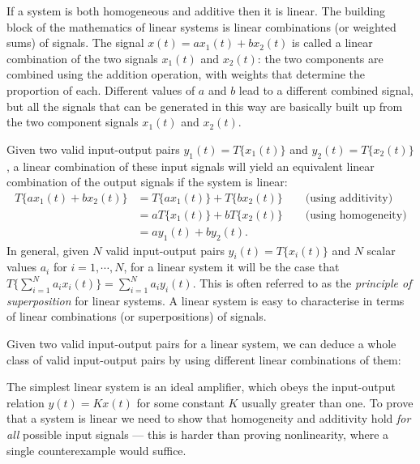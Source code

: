 \documentclass[10pt]{beamer}
\begin{document}
If a system is both homogeneous and additive then it is linear.  The building block of the mathematics of linear systems is linear combinations (or weighted sums) of signals.  The signal $x(t) = a x_1(t) + b x_2(t)$ is called a linear combination of the two signals $x_1(t)$ and $x_2(t)$:  the two components are combined using the addition operation, with weights that determine the proportion of each.  Different values of $a$ and $b$ lead to a different combined signal, but all the signals that can be generated in this way are basically built up from the two component signals $x_1(t)$ and $x_2(t)$.

Given two valid input-output pairs $y_1(t) = T\{x_1(t)\}$ and $y_2(t) = T\{x_2(t)\}$, a linear combination of these input signals will yield an equivalent linear combination of the output signals if the system is linear:
\begin{align*}
  T\{a x_1(t) + b x_2(t)\} &= T\{a x_1(t)\} + T\{b x_2(t)\} \qquad \text{(using additivity)} \\
  &= a T\{x_1(t)\} + b T\{x_2(t)\} \qquad \text{(using homogeneity)} \\
  &= a y_1(t) + b y_2(t).
\end{align*}
In general, given $N$ valid input-output pairs $y_i(t) = T\{x_i(t)\}$ and $N$ scalar values $a_i$ for $i = 1, \cdots, N$, for a linear system it will be the case that $T\{\sum_{i=1}^N a_i x_i(t)\} = \sum_{i=1}^N a_i y_i(t)$.  This is often referred to as the {\em principle of superposition} for linear systems.  A linear system is easy to characterise in terms of linear combinations (or superpositions) of signals. 

Given two valid input-output pairs for a linear system, we can deduce a whole class of valid input-output pairs by using different linear combinations of them:
\begin{center}
\end{center}

The simplest linear system is an ideal amplifier, which obeys the input-output relation $y(t) = K x(t)$ for some constant $K$ usually greater than one.  To prove that a system is linear we need to show that homogeneity and additivity hold {\em for all} possible input signals --- this is harder than proving nonlinearity, where a single counterexample would suffice.  
\end{document}
